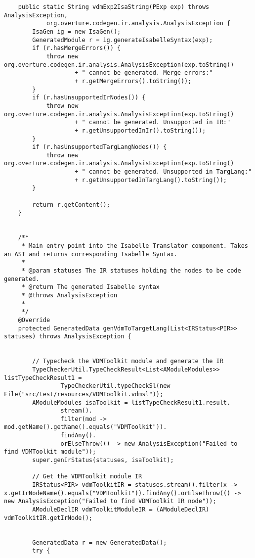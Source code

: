 \begin{appendices}
\begin{lstlisting}
    public static String vdmExp2IsaString(PExp exp) throws AnalysisException,
            org.overture.codegen.ir.analysis.AnalysisException {
        IsaGen ig = new IsaGen();
        GeneratedModule r = ig.generateIsabelleSyntax(exp);
        if (r.hasMergeErrors()) {
            throw new org.overture.codegen.ir.analysis.AnalysisException(exp.toString()
                    + " cannot be generated. Merge errors:"
                    + r.getMergeErrors().toString());
        }
        if (r.hasUnsupportedIrNodes()) {
            throw new org.overture.codegen.ir.analysis.AnalysisException(exp.toString()
                    + " cannot be generated. Unsupported in IR:"
                    + r.getUnsupportedInIr().toString());
        }
        if (r.hasUnsupportedTargLangNodes()) {
            throw new org.overture.codegen.ir.analysis.AnalysisException(exp.toString()
                    + " cannot be generated. Unsupported in TargLang:"
                    + r.getUnsupportedInTargLang().toString());
        }

        return r.getContent();
    }


    /**
     * Main entry point into the Isabelle Translator component. Takes an AST and returns corresponding Isabelle Syntax.
     *
     * @param statuses The IR statuses holding the nodes to be code generated.
     * @return The generated Isabelle syntax
     * @throws AnalysisException
     *
     */
    @Override
    protected GeneratedData genVdmToTargetLang(List<IRStatus<PIR>> statuses) throws AnalysisException {


        // Typecheck the VDMToolkit module and generate the IR
        TypeCheckerUtil.TypeCheckResult<List<AModuleModules>> listTypeCheckResult1 =
                TypeCheckerUtil.typeCheckSl(new File("src/test/resources/VDMToolkit.vdmsl"));
        AModuleModules isaToolkit = listTypeCheckResult1.result.
                stream().
                filter(mod -> mod.getName().getName().equals("VDMToolkit")).
                findAny().
                orElseThrow(() -> new AnalysisException("Failed to find VDMToolkit module"));
        super.genIrStatus(statuses, isaToolkit);

        // Get the VDMToolkit module IR
        IRStatus<PIR> vdmToolkitIR = statuses.stream().filter(x -> x.getIrNodeName().equals("VDMToolkit")).findAny().orElseThrow(() -> new AnalysisException("Failed to find VDMToolkit IR node"));
        AModuleDeclIR vdmToolkitModuleIR = (AModuleDeclIR) vdmToolkitIR.getIrNode();


        GeneratedData r = new GeneratedData();
        try {



\end{lstlisting}
\end{appendices}
